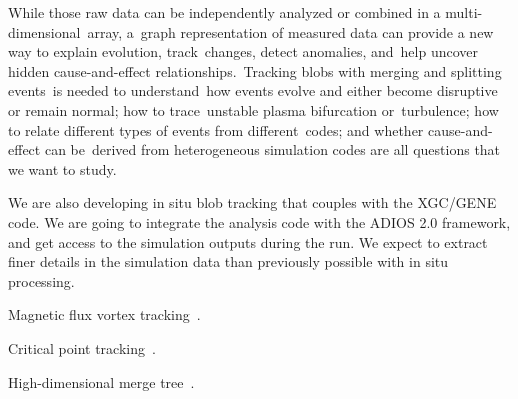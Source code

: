 While those raw data can be independently analyzed or combined in a multi-dimensional array, a graph representation of measured data can provide a new way to explain evolution, track changes, detect anomalies, and help uncover hidden cause-and-effect relationships. Tracking blobs with merging and splitting events is needed to understand how events evolve and either become disruptive or remain normal; how to trace unstable plasma bifurcation or turbulence; how to relate different types of events from different codes; and whether cause-and-effect can be derived from heterogeneous simulation codes are all questions that we want to study.

We are also developing in situ blob tracking that couples with the XGC/GENE code.  We are going to integrate the analysis code with the ADIOS 2.0 framework, and get access to the simulation outputs during the run.  We expect to extract finer details in the simulation data than previously possible with in situ processing.  



Magnetic flux vortex tracking~\cite{GuoPPKG16, GuoPG17, PhillipsGPKG16, PhillipsPKG15}.

Critical point tracking~\cite{ReininghausKWH12}.

High-dimensional merge tree~\cite{OesterlingHWMS17}. 

